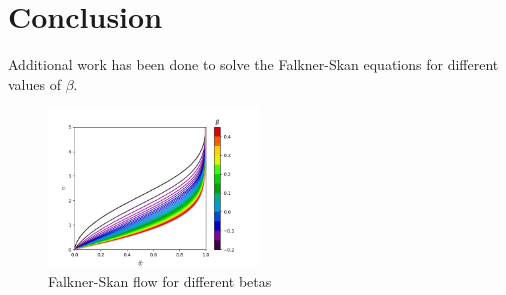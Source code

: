\documentclass[conf]{new-aiaa}
\begin{document}
\section{Conclusion}

\appendix
Additional work has been done to solve the Falkner-Skan equations for different values of $\beta$. 
\begin{figure}
    \centering
    \includegraphics[width=0.5\textwidth]{Continuous beta.png}
    \caption{Falkner-Skan flow for different betas}
    \label{fig:Falkner-Skan multiples betas}
\end{figure}
\end{document}
